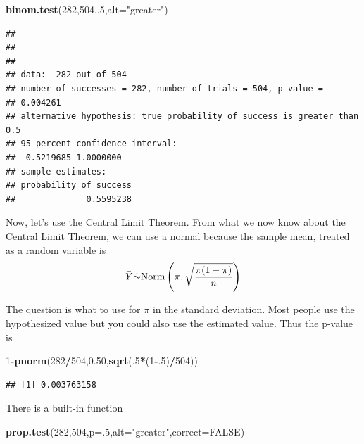 \documentclass[]{book}
\newenvironment{Shaded}{\begin{snugshade}}{\end{snugshade}}
\newcommand{\KeywordTok}[1]{\textcolor[rgb]{0.13,0.29,0.53}{\textbf{#1}}}
\newcommand{\DataTypeTok}[1]{\textcolor[rgb]{0.13,0.29,0.53}{#1}}
\newcommand{\DecValTok}[1]{\textcolor[rgb]{0.00,0.00,0.81}{#1}}
\newcommand{\FloatTok}[1]{\textcolor[rgb]{0.00,0.00,0.81}{#1}}
\newcommand{\StringTok}[1]{\textcolor[rgb]{0.31,0.60,0.02}{#1}}
\newcommand{\OtherTok}[1]{\textcolor[rgb]{0.56,0.35,0.01}{#1}}
\newcommand{\OperatorTok}[1]{\textcolor[rgb]{0.81,0.36,0.00}{\textbf{#1}}}
\newcommand{\NormalTok}[1]{#1}
\theoremstyle{definition}
\theoremstyle{definition}
\theoremstyle{definition}
\theoremstyle{remark}
\begin{document}
\begin{Shaded}
\begin{Highlighting}[]
\KeywordTok{binom.test}\NormalTok{(}\DecValTok{282}\NormalTok{,}\DecValTok{504}\NormalTok{,.}\DecValTok{5}\NormalTok{,}\DataTypeTok{alt=}\StringTok{"greater"}\NormalTok{)}
\end{Highlighting}
\end{Shaded}

\begin{verbatim}
## 
## 
## 
## data:  282 out of 504
## number of successes = 282, number of trials = 504, p-value =
## 0.004261
## alternative hypothesis: true probability of success is greater than 0.5
## 95 percent confidence interval:
##  0.5219685 1.0000000
## sample estimates:
## probability of success 
##              0.5595238
\end{verbatim}

Now, let's use the Central Limit Theorem. From what we now know about
the Central Limit Theorem, we can use a normal because the sample mean,
treated as a random variable is
\[\bar{Y}\dot{\sim} \mbox{Norm}\left(\pi,{\sqrt{\pi(1-\pi)  \over n}}\right)\]

The question is what to use for \(\pi\) in the standard deviation. Most
people use the hypothesized value but you could also use the estimated
value. Thus the p-value is

\begin{Shaded}
\begin{Highlighting}[]
\DecValTok{1}\OperatorTok{-}\KeywordTok{pnorm}\NormalTok{(}\DecValTok{282}\OperatorTok{/}\DecValTok{504}\NormalTok{,}\FloatTok{0.50}\NormalTok{,}\KeywordTok{sqrt}\NormalTok{(.}\DecValTok{5}\OperatorTok{*}\NormalTok{(}\DecValTok{1}\OperatorTok{-}\NormalTok{.}\DecValTok{5}\NormalTok{)}\OperatorTok{/}\DecValTok{504}\NormalTok{))}
\end{Highlighting}
\end{Shaded}

\begin{verbatim}
## [1] 0.003763158
\end{verbatim}

There is a built-in function

\begin{Shaded}
\begin{Highlighting}[]
\KeywordTok{prop.test}\NormalTok{(}\DecValTok{282}\NormalTok{,}\DecValTok{504}\NormalTok{,}\DataTypeTok{p=}\NormalTok{.}\DecValTok{5}\NormalTok{,}\DataTypeTok{alt=}\StringTok{"greater"}\NormalTok{,}\DataTypeTok{correct=}\OtherTok{FALSE}\NormalTok{)}
\end{Highlighting}
\end{Shaded}
\end{document}
